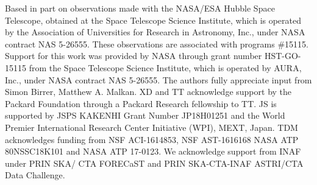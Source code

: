 \documentclass[twocolumn,trackchanges]{aastex63}
\begin{document}
\acknowledgments
Based in part on observations made with the NASA/ESA Hubble Space Telescope, obtained at the Space Telescope Science Institute, which is operated by the Association of Universities for Research in Astronomy, Inc., under NASA contract NAS 5-26555. These observations are associated with programs \#15115. Support for this work was provided by NASA through grant number HST-GO-15115 from the Space Telescope Science Institute, which is operated by AURA, Inc., under NASA contract NAS 5-26555. The authors fully appreciate input from Simon Birrer, Matthew A. Malkan. XD and TT acknowledge support by the Packard Foundation through a Packard Research fellowship to TT. JS is supported by JSPS KAKENHI Grant Number JP18H01251 and the World Premier International Research Center Initiative (WPI), MEXT, Japan. TDM acknowledges funding from NSF ACI-1614853,  NSF AST-1616168 NASA ATP 80NSSC18K101 and NASA ATP 17-0123. We acknowledge support from INAF under PRIN SKA/ CTA FORECaST and PRIN SKA-CTA-INAF ASTRI/CTA Data Challenge. 


%


\end{document}
